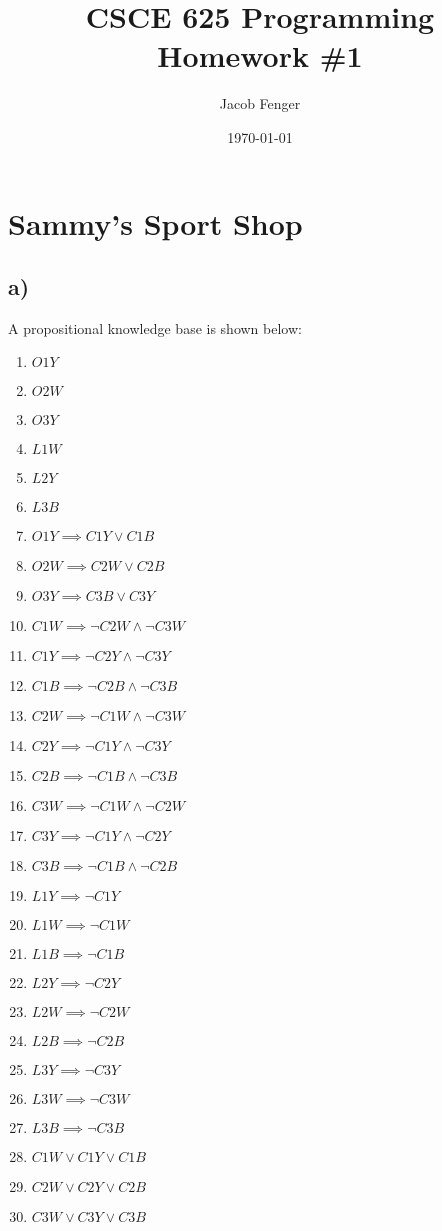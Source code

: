 \documentclass[22pt]{article}
\begin{document}
\title{CSCE 625 Programming Homework \#1}
\author{Jacob Fenger}
\date{\today}
\maketitle

\section{Sammy's Sport Shop}
\subsection*{a)}
A propositional knowledge base is shown below:

\begin{multicols}{2}
\begin{enumerate}
	\item $O1Y$
	\item $O2W$
	\item $O3Y$
	\item $L1W$
	\item $L2Y$
	\item $L3B$
	\item $O1Y \implies C1Y \lor C1B$ 
	\item $O2W \implies C2W \lor C2B$
	\item $O3Y \implies C3B \lor C3Y$
	\item $C1W \implies \neg C2W \land \neg C3W$
	\item $C1Y \implies \neg C2Y \land \neg C3Y$
	\item $C1B \implies \neg C2B \land \neg C3B$
	\item $C2W \implies \neg C1W \land \neg C3W$
	\item $C2Y \implies \neg C1Y \land \neg C3Y$
	\item $C2B \implies \neg C1B \land \neg C3B$
	\item $C3W \implies \neg C1W \land \neg C2W$
	\item $C3Y \implies \neg C1Y \land \neg C2Y$
	\item $C3B \implies \neg C1B \land \neg C2B$
	\item $L1Y \implies \neg C1Y$
	\item $L1W \implies \neg C1W$
	\item $L1B \implies \neg C1B$
	\item $L2Y \implies \neg C2Y$
	\item $L2W \implies \neg C2W$
	\item $L2B \implies \neg C2B$
	\item $L3Y \implies \neg C3Y$
	\item $L3W \implies \neg C3W$
	\item $L3B \implies \neg C3B$
	\item $C1W \lor C1Y \lor C1B$
	\item $C2W \lor C2Y \lor C2B$
	\item $C3W \lor C3Y \lor C3B$
\end{enumerate}
\end{multicols}
\end{document}
